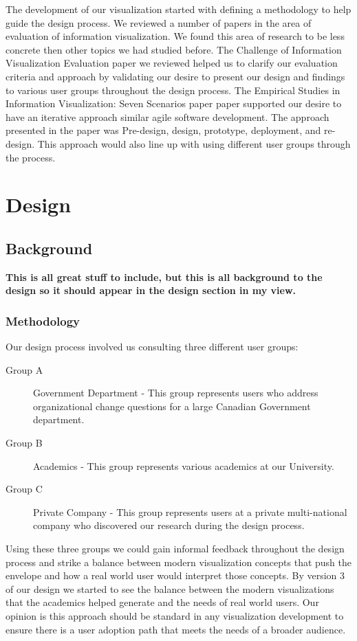 \documentclass[journal]{vgtc}                %
\begin{document}
The development of our visualization started with defining a methodology to help guide the design process.  We reviewed a number of papers in the area of evaluation of information visualization.  We found this area of research to be less concrete then other topics we had studied before.  The Challenge of Information Visualization Evaluation\cite{challengeofinfoviseval} paper we reviewed helped us to clarify our evaluation criteria and approach by validating our desire to present our design and findings to various user groups throughout the design process.  The Empirical Studies in Information Visualization: Seven Scenarios paper\cite{sevenscenarios} paper supported our desire to have an iterative approach similar agile software development.  The approach presented in the paper was Pre-design, design, prototype, deployment, and re-design.  This approach would also line up with using different user groups through the process.

\section{Design}

\subsection{Background}

\textbf{{\color{Plum} This is all great stuff to include, but this is all background to the design so it should appear in the design section in my view. }}

\subsubsection{Methodology}


Our design process involved us consulting three different user groups:
\begin{description}
	\item [Group A] Government Department - This group represents users who address organizational change questions for a large Canadian Government department. 
	\item [Group B] Academics - This group represents various academics at our University.
	\item [Group C] Private Company - This group represents users at a private multi-national company who discovered our research during the design process.
\end{description}

Using these three groups we could gain informal feedback throughout the design process and strike a balance between modern visualization concepts that push the envelope and how a real world user would interpret those concepts.  By version 3 of our design we started to see the balance between the modern visualizations that the academics helped generate and the needs of real world users.  Our opinion is this approach should be standard in any visualization development to ensure there is a user adoption path that meets the needs of a broader audience.
\end{document}
